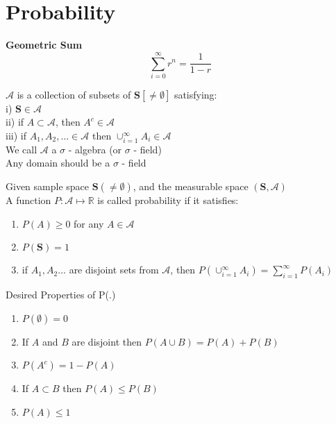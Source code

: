 \documentclass[14pt, oneside, letterpaper]{notes}
\begin{document}

%
%

\section*{Probability}
\begin{remark}
	\textbf{Geometric Sum} \\
	\[ \sum_{i=0}^{\infty}r^n = \frac{1}{1-r} \]
\end{remark}

\begin{mydef}
	$\mathscr{A}$ is a collection of subsets of $\textbf{S}[\neq \emptyset]$
	satisfying: \\
	\indent i) $\textbf{S} \in \mathscr{A}$ \\
	\indent ii) if $ A \subset \mathscr{A}$, then $A^c \in \mathscr{A}$ \\
	\indent iii) if $A_1, A_2, ... \in \mathscr{A}$ then 
	$\cup_{i=1}^{\infty} A_i \in \mathscr{A} $ \\
	We call $\mathscr{A}$ a $\sigma$ - algebra (or $\sigma$ - field) \\
	Any domain should be a $\sigma$ - field
\end{mydef}

\begin{mydef}
	Given sample space $\textbf{S} (\neq \emptyset)$, and the 
	measurable space $(\textbf{S}, \mathscr{A})$ \\
	A function $P: \mathscr{A} \mapsto \mathbb{R}$ is called 
	probability if it satisfies:
	\begin{enumerate}
		\item $P(A) \geq 0$ for any $A \in \mathscr{A}$
		\item $P(\textbf{S}) = 1$
		\item if $A_1, A_2 ...$ are disjoint sets from $\mathscr{A}$,
		then $P(\cup_{i=1}^{\infty} A_i) = \sum_{i=1}^{\infty} P(A_i)$
	\end{enumerate}
\end{mydef}

\begin{remark}
Desired Properties of P(.)
\begin{enumerate}
	\item $P(\emptyset) = 0$
	\item If $A$ and $B$ are disjoint then $P(A \cup B) = P(A) + P(B)$
	\item $P(A^c) = 1- P(A)$
	\item If $A \subset B$ then $P(A) \leq P(B)$
	\item $P(A) \leq 1$
\end{enumerate}
\end{remark}
\end{document}
